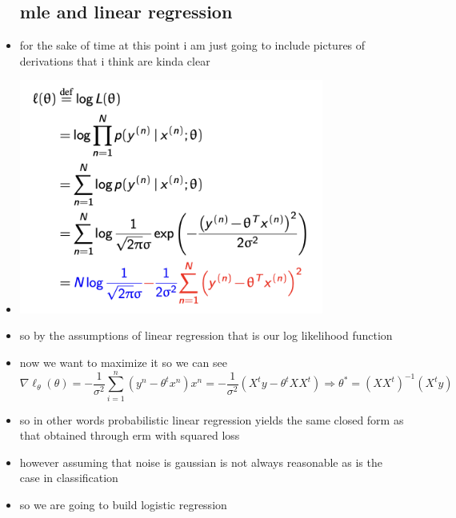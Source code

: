 \documentclass{article}
\begin{document}
\begin{itemize}
\subsection*{mle and linear regression}
\item for the sake of time at this point i am just going to include pictures of derivations that i think are kinda clear
\item \includegraphics*[width=10cm]{images/Screenshot 2023-05-13 at 4.57.32 PM.png}
\item so by the assumptions of linear regression that is our log likelihood function 
\item now we want to maximize it so we can see $$\nabla \ell_{\theta}(\theta)=-\frac{1}{\sigma^{2}}\sum_{i=1}^{n}(y^n-\theta^tx^n)x^n=-\frac{1}{\sigma^{2}}(X^ty-\theta^tXX^{t})\Rightarrow \theta^{*}=(XX^t)^{-1}(X^ty)$$
\item so in other words probabilistic linear regression yields the same closed form as that obtained through erm with squared loss 
\item however assuming that noise is gaussian is not always reasonable as is the case in classification 
\item so we are going to build logistic regression

\end{itemize}
\end{document}
